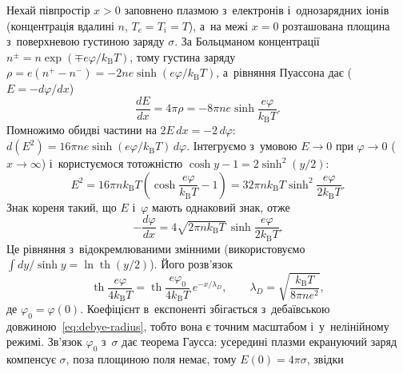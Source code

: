 Нехай півпростір $x>0$ заповнено плазмою з~електронів і~однозарядних іонів (концентрація
вдалині $n$, $T_e=T_i=T$), а~на межі $x=0$ розташована площина з~поверхневою густиною
заряду $\sigma$. За Больцманом концентрації $n^{\pm}=n\exp(\mp e\varphi/k_{\mathrm B}T)$,
тому густина заряду $\rho=e(n^+-n^-)=-2ne\sinh(e\varphi/k_{\mathrm B}T)$, а~рівняння
Пуассона дає ($E=-d\varphi/dx$)
\begin{equation*}
	\frac{dE}{dx}=4\pi\rho=-8\pi ne\sinh\frac{e\varphi}{k_{\mathrm B}T}.
\end{equation*}
Помножимо обидві частини на $2E\,dx=-2\,d\varphi$: $d(E^2)=16\pi
ne\sinh(e\varphi/k_{\mathrm B}T)\,d\varphi$. Інтегруємо з~умовою $E\to0$ при $\varphi\to0$
($x\to\infty$) і~користуємося тотожністю $\cosh y-1=2\sinh^2(y/2)$:
\begin{equation*}
	E^2=16\pi nk_{\mathrm B}T\left(\cosh\frac{e\varphi}{k_{\mathrm B}T}-1\right)=32\pi nk_{\mathrm B}T\sinh^2\frac{e\varphi}{2k_{\mathrm B}T}.
\end{equation*}
Знак кореня такий, що $E$ і~$\varphi$ мають однаковий знак, отже
\begin{equation*}
	-\frac{d\varphi}{dx}=4\sqrt{2\pi nk_{\mathrm B}T}\,\sinh\frac{e\varphi}{2k_{\mathrm B}T}.
\end{equation*}
Це рівняння з~відокремлюваними змінними (використовуємо $\int dy/\sinh
y=\ln\operatorname{th}(y/2)$). Його розв'язок
\begin{equation}\label{eq:gouy-chapman}
	\operatorname{th}\frac{e\varphi}{4k_{\mathrm B}T}=\operatorname{th}\frac{e\varphi_0}{4k_{\mathrm B}T}\,e^{-x/\lambda_D},\qquad
	\lambda_D=\sqrt{\frac{k_{\mathrm B}T}{8\pi ne^2}},
\end{equation}
де $\varphi_0=\varphi(0)$. Коефіцієнт в~експоненті збігається з~дебаївською
довжиною~\eqref{eq:debye-radius}, тобто вона є точним масштабом і~у~нелінійному режимі.
Зв'язок $\varphi_0$ з~$\sigma$ дає теорема Гаусса: усередині плазми екрануючий заряд
компенсує $\sigma$, поза площиною поля немає, тому $E(0)=4\pi\sigma$, звідки
